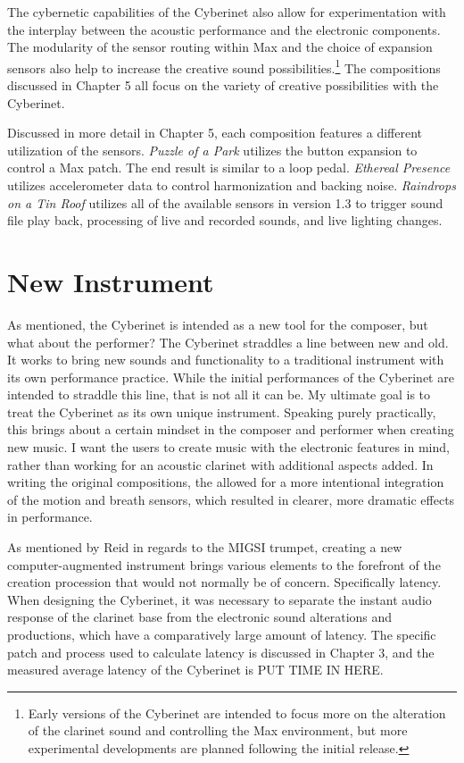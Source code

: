 The cybernetic capabilities of the Cyberinet also allow for experimentation with the interplay between the acoustic performance and the electronic components. The modularity of the sensor routing within Max and the choice of expansion sensors also help to increase the creative sound possibilities.\footnote{Early versions of the Cyberinet are intended to focus more on the alteration of the clarinet sound and controlling the Max environment, but more experimental developments are planned following the initial release.} The compositions discussed in Chapter 5 all focus on the variety of creative possibilities with the Cyberinet. 

Discussed in more detail in Chapter 5, each composition features a different utilization of the sensors. \textit{Puzzle of a Park} utilizes the button expansion to control a Max patch. The end result is similar to a loop pedal. \textit{Ethereal Presence} utilizes accelerometer data to control harmonization and backing noise. \textit{Raindrops on a Tin Roof} utilizes all of the available sensors in version 1.3 to trigger sound file play back, processing of live and recorded sounds, and live lighting changes.


\section{New Instrument}

As mentioned, the Cyberinet is intended as a new tool for the composer, but what about the performer? The Cyberinet straddles a line between new and old. It works to bring new sounds and functionality to a traditional instrument with its own performance practice. While the initial performances of the Cyberinet are intended to straddle this line, that is not all it can be. My ultimate goal is to treat the Cyberinet as its own unique instrument. Speaking purely practically, this brings about a certain mindset in the composer and performer when creating new music. I want the users to create music with the electronic features in mind, rather than working for an acoustic clarinet with additional aspects added. In writing the original compositions, the allowed for a more intentional integration of the motion and breath sensors, which resulted in clearer, more dramatic effects in performance.

As mentioned by Reid in regards to the MIGSI trumpet, creating a new computer-augmented instrument brings various elements to the forefront of the creation procession that would not normally be of concern. Specifically latency.\cite{reid_2019} When designing the Cyberinet, it was necessary to separate the instant audio response of the clarinet base from the electronic sound alterations and productions, which have a comparatively large amount of latency. The specific patch and process used to calculate latency is discussed in Chapter 3, and the measured average latency of the Cyberinet is PUT TIME IN HERE.

